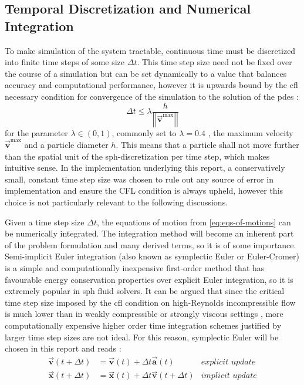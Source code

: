\documentclass[conference]{IEEEtran}
\newcommand\abss[1]{\left|\left|#1\right|\right|}
\newcommand\vek[1]{\vec{\bm{#1}}}
\newcommand\br[1]{\left(#1\right)}
\begin{document}
\subsection{Temporal Discretization and Numerical Integration}\label{sec:time-discretization}
To make simulation of the system tractable, continuous time must be discretized into finite time steps of some size $\Delta t$. This time step size need not be fixed over the course of a simulation but can be set dynamically to a value that balances accuracy and computational performance, however it is upwards bound by the \ac{cfl} necessary condition for convergence of the simulation to the solution of the \acs{pdes} \cite{survey2022}:
\begin{equation}\label{eq:cfl}
    \Delta t \leq \lambda \frac{h}{\abss{\vek{v}^\text{max}}}
\end{equation}
for the parameter $\lambda \in (0,1)$, commonly set to $\lambda=0.4$ \cite{survey2022}\cite{sph-monaghan-92}, the maximum velocity $\vek{v}^\text{max}$ and a particle diameter $h$. This means that a particle shall not move further than the spatial unit of the \ac{sph}-discretization per time step, which makes intuitive sense. In the implementation underlying this report, a conservatively small, constant time step size was chosen to rule out any source of error in implementation and ensure the CFL condition is always upheld, however this choice is not particularly relevant to the following discussions.

Given a time step size $\Delta t$, the equations of motion from \autoref{eq:eqs-of-motions} can be numerically integrated. The integration method will become an inherent part of the problem formulation and many derived terms, so it is of some importance. Semi-implicit Euler integration (also known as symplectic Euler or Euler-Cromer) is a simple and computationally inexpensive first-order method that has favourable energy conservation properties over explicit Euler integration, so it is extremely popular \cite{tutorial2019} in \ac{sph} fluid solvers. It can be argued that since the critical time step size imposed by the \ac{cfl} condition on high-Reynolds incompressible flow is much lower than in weakly compressible or strongly viscous settings \cite{optimal-isph-timestep}, more computationally expensive higher order time integration schemes justified by larger time step sizes are not ideal. For this reason, symplectic Euler will be chosen in this report and reads \cite{survey2022}:
\begin{equation}\label{eq:semi-implicit-euelr}
  \begin{aligned}
    \vek{v}\br{t + \Delta t} &= \vek{v}(t) + \Delta t \vek{a}(t) & \textit{explicit update}\\
    \vek{x}\br{t + \Delta t} &= \vek{x}(t) + \Delta t \vek{v}\br{t + \Delta t} & \textit{implicit update}
  \end{aligned}
\end{equation}
\end{document}
